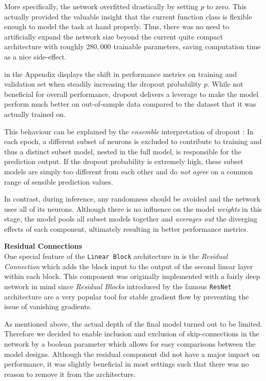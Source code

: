 More specifically, the network overfitted drastically by setting $p$ to zero.
This actually provided the valuable insight that the current function class is flexible enough to model the task at hand properly.
Thus, there was no need to artificially expand the network size beyond the current quite compact architecture with roughly $280,000$ trainable parameters, saving computation time as a nice side-effect.

 in the Appendix displays the shift in performance metrics on training and validation set when steadily increasing the dropout probability $p$.
While not beneficial for overall performance, dropout delivers a leverage to make the model perform much better on out-of-sample data compared to the dataset that it was actually trained on.

This behaviour can be explained by the \emph{ensemble} interpretation of dropout \citep{goodfellow2016}:
In each epoch, a different subset of neurons is excluded to contribute to training and thus a distinct subset model, nested in the full model, is responsible for the prediction output.
If the dropout probability is extremely high, these subset models are simply too different from each other and do \emph{not agree} on a common range of sensible prediction values.

In contrast, during inference, any randomness should be avoided and the network uses all of its neurons.
Although there is no influence on the model \emph{weights} in this stage, the model pools all subset models together and \emph{averages out} the diverging effects of each component, ultimately resulting in better performance metrics.

\textbf{Residual Connections} \\
One special feature of the \texttt{Linear Block} architecture in  is the \emph{Residual Connection} which adds the block input to the output of the second linear layer within each block.
This component was originally implemented with a fairly deep network in mind since \emph{Residual Blocks} introduced by the famous \texttt{ResNet} architecture \citep{he2015} are a very popular tool for stable gradient flow by preventing the issue of vanishing gradients.

As mentioned above, the actual depth of the final model turned out to be limited.
Therefore we decided to enable inclusion and exclusion of skip-connections in the network by a boolean parameter which allows for easy comparisons between the model designs.
Although the residual component did not have a major impact on performance, it was slightly beneficial in most settings such that there was no reason to remove it from the architecture.

